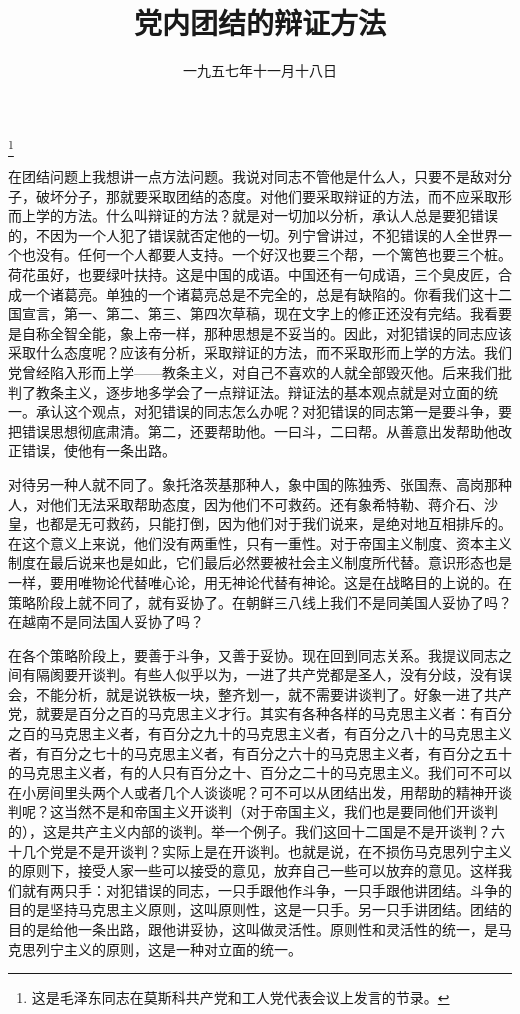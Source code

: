 
\title{党内团结的辩证方法}
\date{一九五七年十一月十八日}
\thanks{这是毛泽东同志在莫斯科共产党和工人党代表会议上发言的节录。}
\maketitle


在团结问题上我想讲一点方法问题。我说对同志不管他是什么人，只要不是敌对分子，破坏分子，那就要采取团结的态度。对他们要采取辩证的方法，而不应采取形而上学的方法。什么叫辩证的方法？就是对一切加以分析，承认人总是要犯错误的，不因为一个人犯了错误就否定他的一切。列宁曾讲过，不犯错误的人全世界一个也没有。任何一个人都要人支持。一个好汉也要三个帮，一个篱笆也要三个桩。荷花虽好，也要绿叶扶持。这是中国的成语。中国还有一句成语，三个臭皮匠，合成一个诸葛亮。单独的一个诸葛亮总是不完全的，总是有缺陷的。你看我们这十二国宣言，第一、第二、第三、第四次草稿，现在文字上的修正还没有完结。我看要是自称全智全能，象上帝一样，那种思想是不妥当的。因此，对犯错误的同志应该采取什么态度呢？应该有分析，采取辩证的方法，而不采取形而上学的方法。我们党曾经陷入形而上学——教条主义，对自己不喜欢的人就全部毁灭他。后来我们批判了教条主义，逐步地多学会了一点辩证法。辩证法的基本观点就是对立面的统一。承认这个观点，对犯错误的同志怎么办呢？对犯错误的同志第一是要斗争，要把错误思想彻底肃清。第二，还要帮助他。一曰斗，二曰帮。从善意出发帮助他改正错误，使他有一条出路。

对待另一种人就不同了。象托洛茨基那种人，象中国的陈独秀、张国焘、高岗那种人，对他们无法采取帮助态度，因为他们不可救药。还有象希特勒、蒋介石、沙皇，也都是无可救药，只能打倒，因为他们对于我们说来，是绝对地互相排斥的。在这个意义上来说，他们没有两重性，只有一重性。对于帝国主义制度、资本主义制度在最后说来也是如此，它们最后必然要被社会主义制度所代替。意识形态也是一样，要用唯物论代替唯心论，用无神论代替有神论。这是在战略目的上说的。在策略阶段上就不同了，就有妥协了。在朝鲜三八线上我们不是同美国人妥协了吗？在越南不是同法国人妥协了吗？

在各个策略阶段上，要善于斗争，又善于妥协。现在回到同志关系。我提议同志之间有隔阂要开谈判。有些人似乎以为，一进了共产党都是圣人，没有分歧，没有误会，不能分析，就是说铁板一块，整齐划一，就不需要讲谈判了。好象一进了共产党，就要是百分之百的马克思主义才行。其实有各种各样的马克思主义者：有百分之百的马克思主义者，有百分之九十的马克思主义者，有百分之八十的马克思主义者，有百分之七十的马克思主义者，有百分之六十的马克思主义者，有百分之五十的马克思主义者，有的人只有百分之十、百分之二十的马克思主义。我们可不可以在小房间里头两个人或者几个人谈谈呢？可不可以从团结出发，用帮助的精神开谈判呢？这当然不是和帝国主义开谈判（对于帝国主义，我们也是要同他们开谈判的），这是共产主义内部的谈判。举一个例子。我们这回十二国是不是开谈判？六十几个党是不是开谈判？实际上是在开谈判。也就是说，在不损伤马克思列宁主义的原则下，接受人家一些可以接受的意见，放弃自己一些可以放弃的意见。这样我们就有两只手：对犯错误的同志，一只手跟他作斗争，一只手跟他讲团结。斗争的目的是坚持马克思主义原则，这叫原则性，这是一只手。另一只手讲团结。团结的目的是给他一条出路，跟他讲妥协，这叫做灵活性。原则性和灵活性的统一，是马克思列宁主义的原则，这是一种对立面的统一。

